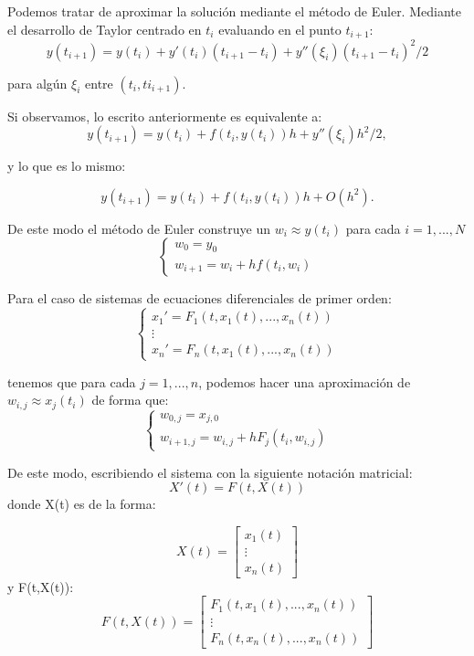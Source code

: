 \documentclass[12pt]{article}       %
\begin{document}
Podemos tratar de aproximar la solución mediante el método de Euler. Mediante el desarrollo de Taylor centrado en $t_i$ evaluando en el punto $t_{i+1}$:
$$
y(t_{i+1})=y(t_i) + y'(t_i)(t_{i+1}-t_i) + y''(\xi_i)(t_{i+1}-t_i)^2/2
$$

para algún $\xi_i$ entre $(t_i, ti_{i+1})$.

Si observamos, lo escrito anteriormente es equivalente a:
$$
y(t_{i+1})=y(t_i) + f(t_i,y(t_i))h + y''(\xi_i)h^2/2,
$$ 

y lo que es lo mismo:

$$
y(t_{i+1})=y(t_i) + f(t_i,y(t_i))h + O(h^2).
$$

De este modo el método de Euler construye un $w_i \approx y(t_i)$ para cada $i=1,...,N$
$$
\begin{cases}
w_0=y_0\\
w_{i+1}=w_i + hf(t_i,w_i)
\end{cases}
$$

Para el caso de sistemas de ecuaciones diferenciales de primer orden:
$$
\begin{cases}
x_1'=F_1(t,x_1(t),...,x_n(t)) \\
\vdots\\
x_n'=F_n(t,x_1(t),...,x_n(t))
\end{cases}
$$

tenemos que para cada $j=1,...,n$, podemos hacer una aproximación de $w_{i,j} \approx x_j(t_i)$ de forma que:
$$
\begin{cases}
w_{0,j}=x_{j,0} \\
w_{i+1,j}=w_{i,j}+ hF_j(t_i,w_{i,j})
\end{cases}
$$

De este modo, escribiendo el sistema con la siguiente notación matricial:
$$
X'(t)=F(t,X(t))
$$
donde X(t) es de la forma:

\begin{equation*}
X(t)=\begin{bmatrix}
	x_1(t) \\
	\vdots \\
	x_n(t)
	\end{bmatrix}
\end{equation*}
y F(t,X(t)):
\begin{equation*}
F(t,X(t))=\begin{bmatrix}
F_1(t,x_1(t),...,x_n(t)) \\
\vdots \\
F_n(t,x_n(t),...,x_n(t))
\end{bmatrix}
\end{equation*}
\end{document}
